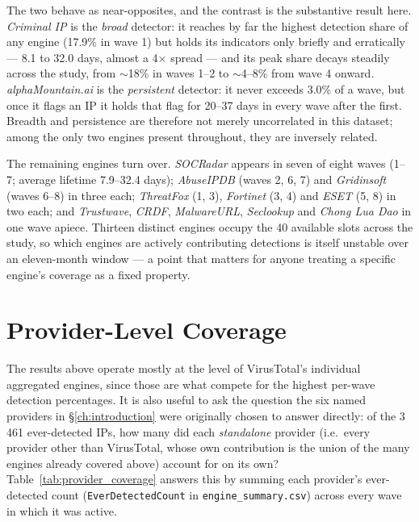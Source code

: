 \documentclass[12pt, a4paper, twoside]{report}
\begin{document}
The two behave as near-opposites, and the contrast is the substantive result here. \emph{Criminal
IP} is the \emph{broad} detector: it reaches by far the highest detection share of any engine
(17.9\% in wave 1) but holds its indicators only briefly and erratically --- 8.1 to 32.0 days,
almost a 4$\times$ spread --- and its peak share decays steadily across the study, from $\sim$18\%
in waves 1--2 to $\sim$4--8\% from wave 4 onward. \emph{alphaMountain.ai} is the \emph{persistent}
detector: it never exceeds 3.0\% of a wave, but once it flags an IP it holds that flag for 20--37
days in every wave after the first. Breadth and persistence are therefore not merely uncorrelated
in this dataset; among the only two engines present throughout, they are inversely related.

The remaining engines turn over. \emph{SOCRadar} appears in seven of eight waves (1--7; average
lifetime 7.9--32.4 days); \emph{AbuseIPDB} (waves 2, 6, 7) and \emph{Gridinsoft} (waves 6--8) in
three each; \emph{ThreatFox} (1, 3), \emph{Fortinet} (3, 4) and \emph{ESET} (5, 8) in two each; and
\emph{Trustwave}, \emph{CRDF}, \emph{MalwareURL}, \emph{Seclookup} and \emph{Chong Lua Dao} in one
wave apiece. Thirteen distinct engines occupy the 40 available slots across the study, so which
engines are actively contributing detections is itself unstable over an eleven-month window --- a
point that matters for anyone treating a specific engine's coverage as a fixed property.

\section{Provider-Level Coverage}
\label{sec:provider_coverage}

The results above operate mostly at the level of VirusTotal's individual aggregated engines, since
those are what compete for the highest per-wave detection percentages. It is also useful to ask the
question the six named providers in \S\ref{ch:introduction} were originally chosen to answer
directly: of the 3\,461 ever-detected IPs, how many did each \emph{standalone} provider (i.e.\ every
provider other than VirusTotal, whose own contribution is the union of the many engines already
covered above) account for on its own? Table~\ref{tab:provider_coverage} answers this by summing
each provider's ever-detected count (\texttt{EverDetectedCount} in \texttt{engine\_summary.csv})
across every wave in which it was active.
\end{document}
